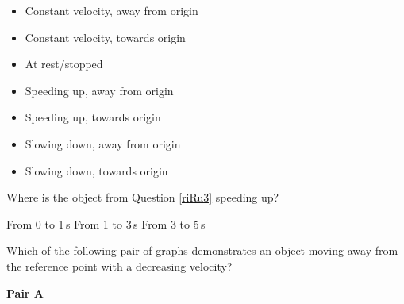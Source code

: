 \documentclass[]{exam}
\begin{document}
\begin{questions}
\begin{minipage}{0.45\textwidth}
\centering
{}
\end{minipage}%
\hspace{2em}
\begin{minipage}{0.45\textwidth}
    \centering
\begin{itemize}[itemsep=0pt]
    \item Constant velocity, away from origin
    \item Constant velocity, towards origin
    \item At rest/stopped
    \item Speeding up, away from origin
    \item Speeding up, towards origin
    \item Slowing down, away from origin
    \item Slowing down, towards origin
\end{itemize}
\end{minipage}


\question \label{Xszkg}
Where is the object from Question \ref{riRu3} speeding up?

\begin{randomizechoices}[norandomize]
    \choice From 0 to 1\,s
    \choice From 1 to 3\,s
    \correctchoice From 3 to 5\,s
\end{randomizechoices}

\clearpage
\question 
Which of the following pair of graphs demonstrates an object moving away from the reference point with a decreasing velocity?

\bigskip

\begin{minipage}{0.45\textwidth}
\centering
\textbf{Pair A}

\vspace{1ex}


\end{minipage}
\end{questions}
\end{document}
